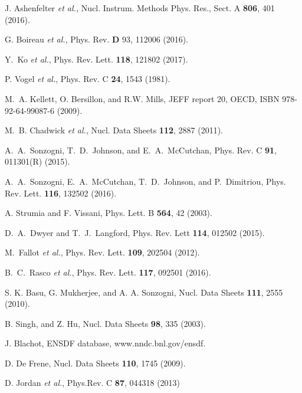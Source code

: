 \documentclass[twocolumn,amsmath,amssymb,10pt,superscriptaddress,a4paper,letterpaper,fleqn]{revtex4-1}
\begin{document}
\begin{thebibliography}{10}
 J. Ashenfelter {\it et al.,} Nucl. Instrum. Methods Phys. Res., Sect. A {\bf 806}, 401 (2016).

 G. Boireau {\it et al.},  Phys. Rev. {\bf D} 93, 112006 (2016).

 Y.~Ko {\it et al.}, Phys. Rev. Lett. {\bf 118}, 121802 (2017).

 P. Vogel {\it et al.}, Phys. Rev. C {\bf 24}, 1543 (1981).

 M.~A. Kellett, O. Bersillon, and R.W. Mills, {\sc JEFF report 20}, OECD, ISBN 978-92-64-99087-6 (2009).  

 M.~B. Chadwick {\it et al.}, Nucl. Data Sheets {\bf 112}, 2887 (2011).    

 A.~A.~Sonzogni, T.~D.~Johnson, and E.~A.~McCutchan, Phys. Rev. C {\bf 91}, 011301(R) (2015).

 A.~A.~Sonzogni, E.~A.~McCutchan, T.~D.~Johnson, and P.~Dimitriou, Phys. Rev. Lett.  {\bf 116}, 132502 (2016).

 A. Strumia and F. Vissani, Phys. Lett. B {\bf 564}, 42 (2003). 

 D.~A.~Dwyer and T.~J.~Langford, Phys. Rev. Lett {\bf 114}, 012502 (2015).

 M.~Fallot {\it et al.},  Phys. Rev. Lett. {\bf 109}, 202504 (2012).

  B.~C.~Rasco {\it et al.}, Phys. Rev. Lett. {\bf 117}, 092501 (2016). 

 S. K. Basu, G. Mukherjee, and A. A. Sonzogni, Nucl. Data Sheets {\bf 111}, 2555 (2010).

  B. Singh, and Z. Hu, Nucl. Data Sheets {\bf 98}, 335 (2003).

 J. Blachot, ENSDF database, www.nndc.bnl.gov/ensdf.

 D. De Frene, Nucl. Data Sheets {\bf 110}, 1745 (2009).

 D. Jordan {\it et al.}, Phys.Rev. C {\bf 87}, 044318 (2013)


\end{thebibliography}
 
                     
\end{document}
